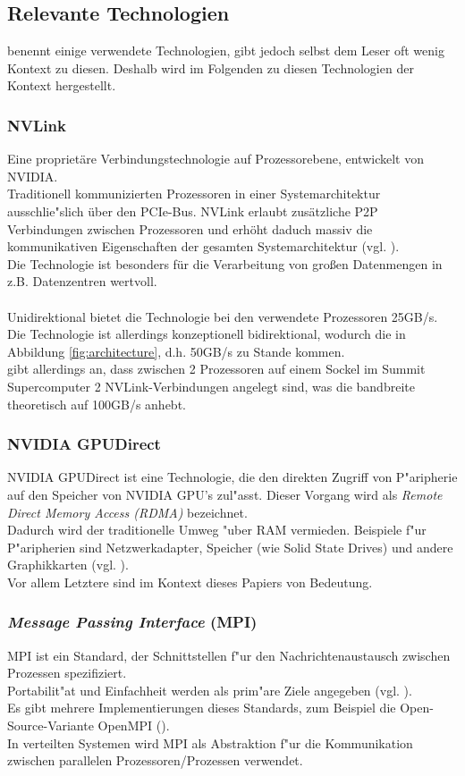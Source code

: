 \subsection{Relevante Technologien}
\cite{mainpaper} benennt einige verwendete Technologien, gibt jedoch selbst dem Leser oft wenig Kontext zu diesen. Deshalb wird im Folgenden zu diesen Technologien der Kontext hergestellt.

\subsubsection{ NVLink }
Eine proprietäre Verbindungstechnologie auf Prozessorebene, entwickelt von NVIDIA.\\
Traditionell kommunizierten Prozessoren in einer Systemarchitektur ausschlie"slich über den PCIe-Bus. NVLink erlaubt zusätzliche P2P Verbindungen zwischen Prozessoren und erhöht daduch massiv die kommunikativen Eigenschaften der gesamten Systemarchitektur (vgl. \cite{nvlink}).\\
Die Technologie ist besonders für die Verarbeitung von großen Datenmengen in z.B. Datenzentren wertvoll.\\
\\
Unidirektional bietet die Technologie bei den verwendete Prozessoren 25GB/s. Die Technologie ist allerdings konzeptionell bidirektional, wodurch die in Abbildung \ref{fig:architecture}, d.h. \cite[Abb. 1]{mainpaper} 50GB/s zu Stande kommen.\\
\cite[FAQ, What is NVLink?]{osummit} gibt allerdings an, dass zwischen 2 Prozessoren auf einem Sockel im Summit Supercomputer 2 NVLink-Verbindungen angelegt sind, was die bandbreite theoretisch auf 100GB/s anhebt.

\subsubsection{ NVIDIA GPUDirect }
NVIDIA GPUDirect ist eine Technologie, die den direkten Zugriff von P"aripherie auf den Speicher von NVIDIA GPU's zul"asst. Dieser Vorgang wird als \textit{Remote Direct Memory Access (RDMA)} bezeichnet.\\
Dadurch wird der traditionelle Umweg "uber RAM vermieden. Beispiele f"ur P"aripherien sind Netzwerkadapter, Speicher (wie Solid State Drives) und andere Graphikkarten (vgl. \cite{gpud}).\\
Vor allem Letztere sind im Kontext dieses Papiers von Bedeutung.

\subsubsection{ \textit{Message Passing Interface} (MPI) }
MPI ist ein Standard, der Schnittstellen f"ur den Nachrichtenaustausch zwischen Prozessen spezifiziert.\\
Portabilit"at und Einfachheit werden als prim"are Ziele angegeben (vgl. \cite[Kap. 1.1]{mpi}).\\
Es gibt mehrere Implementierungen dieses Standards, zum Beispiel die Open-Source-Variante OpenMPI (\cite{openmpi}).\\
In verteilten Systemen wird MPI als Abstraktion f"ur die Kommunikation zwischen parallelen Prozessoren/Prozessen verwendet.

